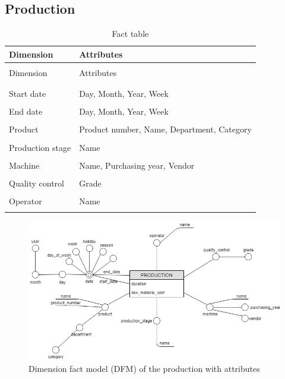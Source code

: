 \documentclass[letterpaper,12pt]{article}
\begin{document}
\subsection{Production}

\begingroup
\renewcommand\arraystretch{0.5}
\begin{longtable}{p{4cm}p{9cm}}
        \caption{Fact table} \\
        Dimension & Attributes \\
        \endfirsthead \\
        Dimension & Attributes \\
        \endhead \\
        \hline \\
        Start date & Day, Month, Year, Week \\
        \hline \\
        End date & Day, Month, Year, Week \\
        \hline \\
        Product & Product number, Name, Department, Category \\
        \hline \\
        Production stage & Name \\
        \hline \\
        Machine & Name, Purchasing year, Vendor \\
        \hline \\
        Quality control & Grade \\
        \hline \\
        Operator & Name \\
        \hline \\
\end{longtable}
\endgroup

\begin{figure}[h] 
        \centering
        \includegraphics[width=\columnwidth]{../images/DFM_Production.png}
        \caption{
                \label{fig:productionAttributes}  
                Dimension fact model (DFM) of the production with attributes 
        }
\end{figure}
\end{document}
